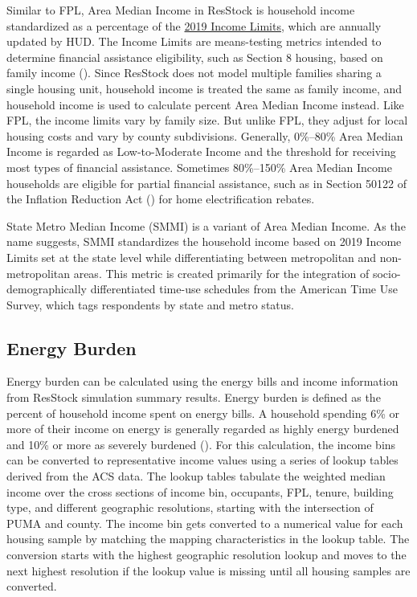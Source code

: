 Similar to FPL, Area Median Income in ResStock is household income standardized as a percentage of the \href{https://www.huduser.gov/portal/datasets/il.html#data_2019}{2019 Income Limits}, which are annually updated by HUD. The Income Limits are means-testing metrics intended to determine financial assistance eligibility, such as Section 8 housing, based on family income (\cite{hud2019_inc_lim_method}). Since ResStock does not model multiple families sharing a single housing unit, household income is treated the same as family income, and household income is used to calculate percent Area Median Income instead. Like FPL, the income limits vary by family size. But unlike FPL, they adjust for local housing costs and vary by county subdivisions. Generally, 0\%--80\% Area Median Income is regarded as Low-to-Moderate Income and the threshold for receiving most types of financial assistance. Sometimes 80\%--150\% Area Median Income households are eligible for partial financial assistance, such as in Section 50122 of the Inflation Reduction Act (\cite{2022IRA}) for home electrification rebates.

State Metro Median Income (SMMI) is a variant of Area Median Income. As the name suggests, SMMI standardizes the household income based on 2019 Income Limits set at the state level while differentiating between metropolitan and non-metropolitan areas. This metric is created primarily for the integration of socio-demographically differentiated time-use schedules from the American Time Use Survey, which tags respondents by state and metro status.

\subsection{Energy Burden}\label{resstock_input_energy_burden}
Energy burden can be calculated using the energy bills and income information from ResStock simulation summary results. Energy burden is defined as the percent of household income spent on energy bills. A household spending 6\% or more of their income on energy is generally regarded as highly energy burdened and 10\% or more as severely burdened (\cite{drehobl2020_energy_burden}).  For this calculation, the income bins can be converted to representative income values using a series of lookup tables derived from the ACS data. The lookup tables tabulate the weighted median income over the cross sections of income bin, occupants, FPL, tenure, building type, and different geographic resolutions, starting with the intersection of PUMA and county. The income bin gets converted to a numerical value for each housing sample by matching the mapping characteristics in the lookup table. The conversion starts with the highest geographic resolution lookup and moves to the next highest resolution if the lookup value is missing until all housing samples are converted.

